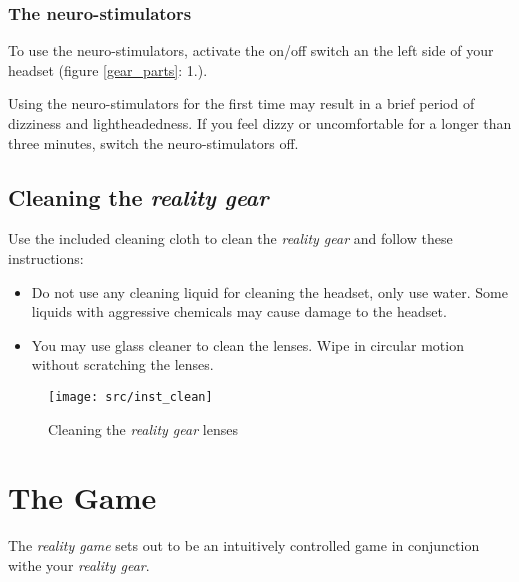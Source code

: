 \subsection{The neuro-stimulators}

To use the neuro-stimulators, activate the on/off switch an the left side of your headset (figure \ref{gear_parts}: 1.). 

Using the neuro-stimulators for the first time may result in a brief period of dizziness and lightheadedness. If you feel dizzy or uncomfortable for a longer than three minutes, switch the neuro-stimulators off.

\newpage
\section[Cleaning the \emph{\pokeT{} reality gear}]{Cleaning the \emph{\poke{} reality gear}}

Use the included cleaning cloth to clean the \emph{\poke{} reality gear} and follow these instructions:

\begin{itemize}
\item Do not use any cleaning liquid for cleaning the headset, only use water. Some liquids with aggressive chemicals may cause damage to the headset.
\label{cleaningLenses}
\item You may use glass cleaner to clean the lenses. Wipe in circular motion without scratching the lenses.
\end{itemize}
\begin{figure}[!ht]
\begin{center}
\texttt{[image: src/inst\_clean]}
\end{center}
\caption[Cleaning the \emph{\pokeT{} reality gear} lenses]{Cleaning the \emph{\poke{} reality gear} lenses}
\label{gear_clean}
\end{figure}

\chapter{The Game}

The \emph{\poke{} reality game} sets out to be an intuitively controlled game in conjunction withe your \emph{\poke{} reality gear}.



